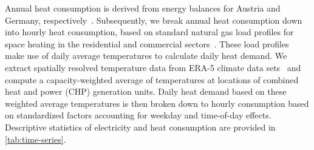 \documentclass[review, 3p, times, 12pt, authoryear]{elsarticle}
\begin{document}
    Annual heat consumption is derived from energy balances for Austria and Germany, respectively~\citep{AGEB2018, StatistikAustria2020}.
    Subsequently, we break annual heat consumption down into hourly heat consumption, based on standard natural gas load profiles for space heating in the residential and commercial sectors~\citep{Almbauer2008}.
    These load profiles make use of daily average temperatures to calculate daily heat demand.
    We extract spatially resolved temperature data from ERA-5 climate data sets~ and compute a capacity-weighted average of temperatures at locations of combined heat and power (CHP) generation units.
    Daily heat demand based on these weighted average temperatures is then broken down to hourly consumption based on standardized factors accounting for weekday and time-of-day effects.
    Descriptive statistics of electricity and heat consumption are provided in \autoref{tab:time-series}.
\end{document}
